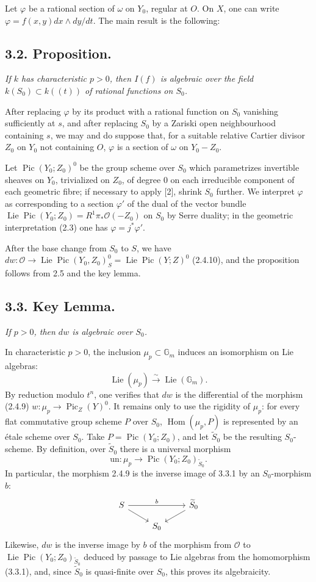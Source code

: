 \documentclass[11pt]{article}
\DeclareMathOperator{\Lie}{Lie}
\DeclareMathOperator{\Pic}{Pic}
\DeclareMathOperator{\Hom}{Hom}
\newcommand{\OO}{\mathcal O}
\newcommand{\GG}{\mathbb G}
\begin{document}
Let $\varphi$ be a rational section of $\omega$ on $Y_0$, regular at $O$. On $X$, one can write $\varphi=f(x,y)dx\wedge dy/dt$. The main result is the following:

\subsection*{3.2. Proposition.}
\emph{If $k$ has characteristic $p>0$, then $I(f)$ is algebraic over the field $k(S_0)\subset k((t))$ of rational functions on $S_0$.}

After replacing $\varphi$ by its product with a rational function on $S_0$ vanishing sufficiently at $s$, and after replacing $S_0$ by a Zariski open neighbourhood containing $s$, we may and do suppose that, for a suitable relative Cartier divisor $Z_0$ on $Y_0$ not containing $O$, $\varphi$ is a section of $\omega$ on $Y_0-Z_0$.

Let $\Pic(Y_0;Z_0)^0$ be the group scheme over $S_0$ which parametrizes invertible sheaves on $Y_0$, trivialized on $Z_0$, of degree 0 on each irreducible component of each geometric fibre; if necessary to apply [2], shrink $S_0$ further. We interpret $\varphi$ as corresponding to a section $\varphi'$ of the dual of the vector bundle $\Lie\Pic(Y_0;Z_0)=R^1\pi_*\OO(-Z_0)$ on $S_0$ by Serre duality; in the geometric interpretation (2.3) one has $\varphi=j^*\varphi'$.

After the base change from $S_0$ to $S$, we have $dw:\OO\to\Lie\Pic(Y_0,Z_0)^0_S=\Lie\Pic(Y;Z)^0$ (2.4.10), and the proposition follows from 2.5 and the key lemma.

\subsection*{3.3. Key Lemma.}
\emph{If $p>0$, then $dw$ is algebraic over $S_0$.}

In characteristic $p>0$, the inclusion $\mu_p\subset\GG_m$ induces an isomorphism on Lie algebras:
\[
        \Lie(\mu_p)\xrightarrow{\sim}\Lie(\GG_m).
\]
By reduction modulo $t^n$, one verifies that $dw$ is the differential of the morphism (2.4.9) $w:\mu_p\to\Pic_Z(Y)^0$. It remains only to use the rigidity of $\mu_p$: for every flat commutative group scheme $P$ over $S_0$, $\Hom(\mu_p,P)$ is represented by an étale scheme over $S_0$. Take $P=\Pic(Y_0;Z_0)$, and let $\widetilde S_0$ be the resulting $S_0$-scheme. By definition, over $\widetilde S_0$ there is a universal morphism
\begin{equation}
        \mathrm{un}:\mu_p\longrightarrow\Pic(Y_0;Z_0)_{\widetilde S_0}. \tag{3.3.1}
\end{equation}
In particular, the morphism 2.4.9 is the inverse image of 3.3.1 by an $S_0$-morphism $b$:
\[
\begin{tikzcd}[row sep=small]
S \arrow[rr,"b"] \arrow[dr] & & \widetilde S_0 \arrow[dl] \\
& S_0 &
\end{tikzcd}
\]
Likewise, $dw$ is the inverse image by $b$ of the morphism from $\OO$ to $\Lie\Pic(Y_0;Z_0)_{\widetilde S_0}$ deduced by passage to Lie algebras from the homomorphism (3.3.1), and, since $\widetilde S_0$ is quasi-finite over $S_0$, this proves its algebraicity.
\end{document}
